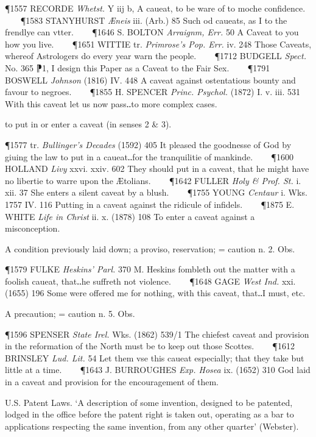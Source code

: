 \begin{description}[wide, labelwidth=!, labelindent=0pt]
\begin{myenumerate}
\P 1557 RECORDE  \textit{Whetst.} Y iij b, A caueat, to be ware of to moche confidence.    
\P 1583 STANYHURST  \textit{Æneis} iii. (Arb.) 85 Such od caueats, as I to the frendlye can vtter.    
\P 1646 S. BOLTON  \textit{Arraignm, Err.} 50 A Caveat to you how you live.    
\P 1651 WITTIE tr. \textit{Primrose's Pop. Err.} iv. 248 Those Caveats, whereof Astrologers do every year warn the people.    
\P 1712 BUDGELL  \textit{Spect.} No. 365 ⁋1, I design this Paper as a Caveat to the Fair Sex.    
\P 1791 BOSWELL  \textit{Johnson} (1816) IV. 448 A caveat against ostentatious bounty and favour to negroes.    
\P 1855 H. SPENCER  \textit{Princ. Psychol.} (1872) I. v. iii. 531 With this caveat let us now pass‥to more complex cases.

 to put in or enter a caveat (in senses 2 \& 3).

\P 1577 tr. \textit{Bullinger's Decades} (1592) 405 It pleased the goodnesse of God by giuing the law to put in a caueat‥for the tranquilitie of mankinde.    
\P 1600 HOLLAND  \textit{Livy} xxvi. xxiv. 602 They should put in a caveat, that he might have no libertie to warre upon the Ætolians.    
\P 1642 FULLER  \textit{Holy \& Prof. St.} i. xii. 37 She enters a silent caveat by a blush.    
\P 1755 YOUNG  \textit{Centaur} i. Wks. 1757 IV. 116  Putting in a caveat against the ridicule of infidels.    
\P 1875 E. WHITE  \textit{Life in Christ} ii. x. (1878) 108 To enter a caveat against a misconception.

 A condition previously laid down; a proviso, reservation; = caution n. 2. Obs.

\P 1579 FULKE  \textit{Heskins' Parl.} 370 M. Heskins fombleth out the matter with a foolish caueat, that‥he suffreth not violence.    
\P 1648 GAGE  \textit{West Ind.} xxi. (1655) 196 Some were offered me for nothing, with this caveat, that‥I must, etc.

 A precaution; = caution n. 5. Obs.

\P 1596 SPENSER  \textit{State Irel.} Wks. (1862) 539/1 The chiefest caveat and provision in the reformation of the North must be to keep out those Scottes.    
\P 1612 BRINSLEY  \textit{Lud. Lit.} 54 Let them vse this caueat especially; that they take but little at a time.    
\P 1643 J. BURROUGHES  \textit{Exp. Hosea} ix. (1652) 310 God laid in a caveat and provision for the encouragement of them.

 U.S. Patent Laws. ‘A description of some invention, designed to be patented, lodged in the office before the patent right is taken out, operating as a bar to applications respecting the same invention, from any other quarter’ (Webster).


\end{myenumerate}
\end{description}
